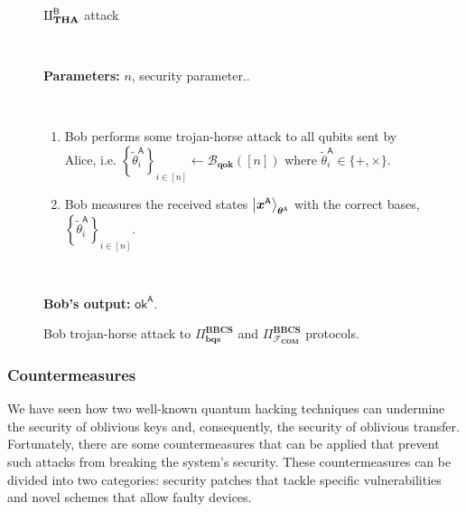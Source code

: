 \begin{figure}[h!]
    \centering
        \begin{tcolorbox}
            
            \centerline{$\rotPi^{\mathsf{B}}_{\textbf{THA}}$ attack}
            
            \
            
            \textbf{Parameters:}  $n$, security parameter..
            
            \
            
            \begin{enumerate}
         \item Bob performs some trojan-horse attack to all qubits sent by Alice, i.e. $\left\{\tilde{\theta}^{\mathsf{A}}_{i}\right\}_{i\in [n]} \leftarrow \mathcal{B}_{\textbf{qok}}([n]) $ where $\tilde{\theta}^{\mathsf{A}}_{i}\in\{+, \times\}$.
         \item Bob measures the received states $\ket{\bm{x}^{\textsf{A}}}_{\bm{\theta}^{\textsf{A}}}$ with the correct bases, $\left\{\tilde{\theta}^{\mathsf{A}}_{i}\right\}_{i\in [n]}$. 
    \end{enumerate}    
            
            \
            
        \textbf{Bob's output:} $\mathsf{ok}^{\mathsf{A}}$.

        
        \end{tcolorbox}
    \caption{Bob trojan-horse attack to $\Pi^{\textbf{BBCS}}_{\textbf{bqs}}$ and $\Pi^{\textbf{BBCS}}_{\mathcal{F}_\textbf{COM}}$ protocols.}
    \label{fig:B_THA}
\end{figure}




\subsubsection{Countermeasures}

We have seen how two well-known quantum hacking techniques can undermine the security of oblivious keys and, consequently, the security of oblivious transfer. Fortunately, there are some countermeasures that can be applied that prevent such attacks from breaking
the system's security. These countermeasures can be divided into two categories: security patches that tackle specific vulnerabilities and novel schemes that allow faulty devices. 

